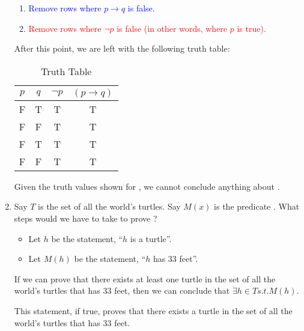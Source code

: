 \documentclass{article}
\begin{document}
\begin{enumerate}
          \begin{enumerate}
              \item \textcolor{blue}{Remove rows where $p \rightarrow q$ is false.}
              \item \textcolor{red}{Remove rows where $\neg p$ is false (in other words, where $p$ is true).}
          \end{enumerate}

          After this point, we are left with the following truth table:

          \begin{table}[h]
              \centering
              \begin{tabular}{|c|c||c|c|}
                  \hline
                  $p$ & $q$ & $\neg p$ & $(p \rightarrow q)$ \\ \hline
                  \hline
                  F   & T   & T        & T                   \\ \hline
                  F   & F   & T        & T                   \\ \hline
                  F   & T   & T        & T                   \\ \hline
                  F   & F   & T        & T                   \\ \hline
              \end{tabular}
              \caption{Truth Table}
          \end{table}

          Given the truth values shown for , we cannot conclude anything about .

          \newpage

    \item Say $T$ is the set of all the world's turtles. Say $M(x)$ is the predicate
          . What steps would we have to take to prove ?

          \begin{itemize}
              \item Let $h$ be the statement, ``$h$ is a turtle''.
              \item Let $M(h)$ be the statement, ``$h$ has $33$ feet''.
          \end{itemize}
          If we can prove that there exists at least one turtle in the set of all the world's turtles that has $33$ feet, then we can conclude that $\exists h \in T    s.t. M(h)$.

          This statement, if true, proves that there exists a turtle in the set of all
          the world's turtles that has $33$ feet.


\end{enumerate}
\end{document}
